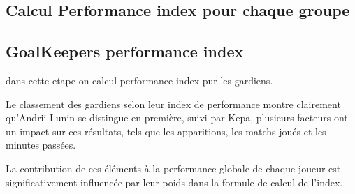 \documentclass[
  6pt,
]{article}
\newenvironment{Shaded}{\begin{snugshade}}{\end{snugshade}}
\newcommand{\AttributeTok}[1]{\textcolor[rgb]{0.13,0.29,0.53}{#1}}
\newcommand{\FloatTok}[1]{\textcolor[rgb]{0.00,0.00,0.81}{#1}}
\newcommand{\FunctionTok}[1]{\textcolor[rgb]{0.13,0.29,0.53}{\textbf{#1}}}
\newcommand{\NormalTok}[1]{#1}
\newcommand{\OtherTok}[1]{\textcolor[rgb]{0.56,0.35,0.01}{#1}}
\newcommand{\SpecialCharTok}[1]{\textcolor[rgb]{0.81,0.36,0.00}{\textbf{#1}}}
\newcommand{\StringTok}[1]{\textcolor[rgb]{0.31,0.60,0.02}{#1}}
\begin{document}
\subsection{Calcul Performance index pour chaque
groupe}\label{calcul-performance-index-pour-chaque-groupe}

\subsection{GoalKeepers performance
index}\label{goalkeepers-performance-index}

dans cette etape on calcul performance index pur les gardiens.

Le classement des gardiens selon leur index de performance montre
clairement qu'Andrii Lunin se distingue en première, suivi par Kepa,
plusieurs facteurs ont un impact sur ces résultats, tels que les
apparitions, les matchs joués et les minutes passées.

La contribution de ces éléments à la performance globale de chaque
joueur est significativement influencée par leur poids dans la formule
de calcul de l'index.

\begin{Shaded}
\end{Shaded}
\end{document}
